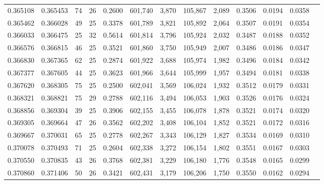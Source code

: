 \begin{tabular}{rrrrrrrrrrrrr}
0.365108 & 0.365453 &  74 &  26 &                                     0.2600 & 601,740 &   3,870 & 105,867 &   2,089 & 0.3506 & 0.0194 & 0.0358 \\
0.365462 & 0.366028 &  49 &  25 &                                     0.3378 & 601,789 &   3,821 & 105,892 &   2,064 & 0.3507 & 0.0191 & 0.0354 \\
0.366033 & 0.366475 &  25 &  32 &                                     0.5614 & 601,814 &   3,796 & 105,924 &   2,032 & 0.3487 & 0.0188 & 0.0352 \\
0.366576 & 0.366815 &  46 &  25 &                                     0.3521 & 601,860 &   3,750 & 105,949 &   2,007 & 0.3486 & 0.0186 & 0.0347 \\
0.366830 & 0.367365 &  62 &  25 &                                     0.2874 & 601,922 &   3,688 & 105,974 &   1,982 & 0.3496 & 0.0184 & 0.0342 \\
0.367377 & 0.367605 &  44 &  25 &                                     0.3623 & 601,966 &   3,644 & 105,999 &   1,957 & 0.3494 & 0.0181 & 0.0338 \\
0.367620 & 0.368305 &  75 &  25 &                                     0.2500 & 602,041 &   3,569 & 106,024 &   1,932 & 0.3512 & 0.0179 & 0.0331 \\
0.368321 & 0.368821 &  75 &  29 &                                     0.2788 & 602,116 &   3,494 & 106,053 &   1,903 & 0.3526 & 0.0176 & 0.0324 \\
0.368856 & 0.369304 &  39 &  25 &                                     0.3906 & 602,155 &   3,455 & 106,078 &   1,878 & 0.3521 & 0.0174 & 0.0320 \\
0.369305 & 0.369664 &  47 &  26 &                                     0.3562 & 602,202 &   3,408 & 106,104 &   1,852 & 0.3521 & 0.0172 & 0.0316 \\
0.369667 & 0.370031 &  65 &  25 &                                     0.2778 & 602,267 &   3,343 & 106,129 &   1,827 & 0.3534 & 0.0169 & 0.0310 \\
0.370078 & 0.370493 &  71 &  25 &                                     0.2604 & 602,338 &   3,272 & 106,154 &   1,802 & 0.3551 & 0.0167 & 0.0303 \\
0.370550 & 0.370835 &  43 &  26 &                                     0.3768 & 602,381 &   3,229 & 106,180 &   1,776 & 0.3548 & 0.0165 & 0.0299 \\
0.370860 & 0.371406 &  50 &  26 &                                     0.3421 & 602,431 &   3,179 & 106,206 &   1,750 & 0.3550 & 0.0162 & 0.0294 \\

\end{tabular}
